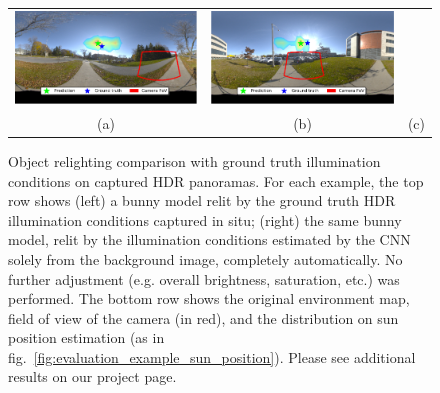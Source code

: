 \begin{figure}[t]
\begin{tabular}{cccccc}
    \multicolumn{2}{c}{
    \includegraphics[width=\RndrWdth]{./figures/valid/panos/AG8A2791_Panorama_hdr-corrected_exr-3_png.pdf}} &
    \multicolumn{2}{c}{
    \includegraphics[width=\RndrWdth]{./figures/valid/panos/AG8A3169_Panorama_hdr-corrected_exr-5_png.pdf}} \\
    \multicolumn{2}{c}{(a)} & \multicolumn{2}{c}{(b)} & \multicolumn{2}{c}{(c)}
    \end{tabular}
    \caption{Object relighting comparison with ground truth illumination conditions on captured HDR panoramas. For each example, the top row shows (left) a bunny model relit by the ground truth HDR illumination conditions captured in situ; (right) the same bunny model, relit by the illumination conditions estimated by the CNN solely from the background image, completely automatically. No further adjustment (e.g. overall brightness, saturation, etc.) was performed. The bottom row shows the original environment map, field of view of the camera (in red), and the distribution on sun position estimation (as in fig.~\ref{fig:evaluation_example_sun_position}). Please see additional results on our project page.}
    \label{fig:hdr-panoramas-validation}
    \vspace{-1em}
\end{figure}

